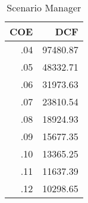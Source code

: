 \documentclass{article}
\begin{document}
\begin{table}[htb]
\caption{\label{ScenarioManager}Scenario Manager}
\begin{tabular}{rr}
COE & DCF \footnotemark\\
\hline
.04 & 97480.87\\
.05 & 48332.71\\
.06 & 31973.63\\
.07 & 23810.54\\
.08 & 18924.93\\
.09 & 15677.35\\
.10 & 13365.25\\
.11 & 11637.39\\
.12 & 10298.65\\
\end{tabular}
\end{table}
\end{document}
